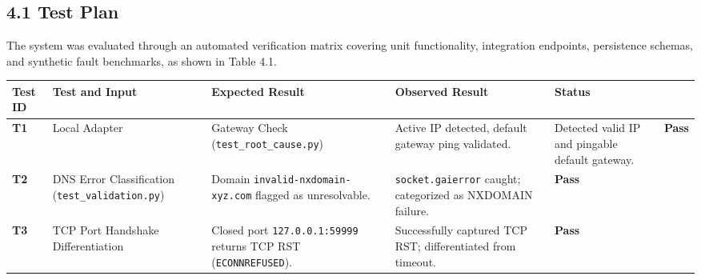 \documentclass[
]{article}
\newcounter{none} %
\begin{document}
\subsection{4.1 Test Plan}\label{test-plan}

The system was evaluated through an automated verification matrix covering unit functionality, integration endpoints, persistence schemas, and synthetic fault benchmarks, as shown in Table 4.1.

{\def\LTcaptype{none} %
\begin{longtable}[]{@{}
  >{\raggedright\arraybackslash}p{}
  >{\raggedright\arraybackslash}p{}
  >{\raggedright\arraybackslash}p{}
  >{\raggedright\arraybackslash}p{}
  >{\raggedright\arraybackslash}p{}@{}}
\toprule\noalign{}
\begin{minipage}[b]{\linewidth}\raggedright
\textbf{Test ID}
\end{minipage} & \begin{minipage}[b]{\linewidth}\raggedright
\textbf{Test and Input}
\end{minipage} & \begin{minipage}[b]{\linewidth}\raggedright
\textbf{Expected Result}
\end{minipage} & \begin{minipage}[b]{\linewidth}\raggedright
\textbf{Observed Result}
\end{minipage} & \begin{minipage}[b]{\linewidth}\raggedright
\textbf{Status}
\end{minipage} \\
\midrule\noalign{}
\endhead
\bottomrule\noalign{}
\endlastfoot
\textbf{T1} & Local Adapter & Gateway Check (\texttt{test\_root\_cause.py}) & Active IP detected, default gateway ping validated. & Detected valid IP and pingable default gateway. & \textbf{Pass} \\
\textbf{T2} & DNS Error Classification (\texttt{test\_validation.py}) & Domain \texttt{invalid-nxdomain-xyz.com} flagged as unresolvable. & \texttt{socket.gaierror} caught; categorized as NXDOMAIN failure. & \textbf{Pass} \\
\textbf{T3} & TCP Port Handshake Differentiation & Closed port \texttt{127.0.0.1:59999} returns TCP RST (\texttt{ECONNREFUSED}). & Successfully captured TCP RST; differentiated from timeout. & \textbf{Pass} \\

\end{longtable}}
\end{document}
